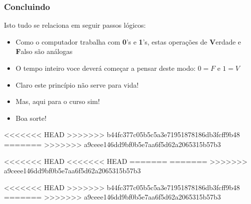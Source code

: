 \documentclass{beamer}
\begin{document}
\begin{frame}
\frametitle{Concluindo}


\begin{block}{Isto tudo se relaciona em seguir passos lógicos: }

\begin{itemize}

  \item Como o computador trabalha com \textbf{0}'s e \textbf{1}'s, estas operações de \textbf{V}erdade e \textbf{F}also são análogas
  \pause
    \item O tempo inteiro voce deverá começar a pensar deste modo: $0 = F$ e $1 = V$
      \pause
    \item Claro este princípio não serve para vida!
      \pause
    \item Mas, aqui para o curso sim!
      \pause
    \item Boa sorte!

\end{itemize}

  \end{block}

<<<<<<< HEAD
>>>>>>> b44fc377c05b5c5a3e71951878186db3fcff9b48
=======
>>>>>>> a9ceee146dd9bf0b5e7aa6f5d62a2065315b57b3

\end{frame}



<<<<<<< HEAD
<<<<<<< HEAD
=======
=======
>>>>>>> a9ceee146dd9bf0b5e7aa6f5d62a2065315b57b3








<<<<<<< HEAD
>>>>>>> b44fc377c05b5c5a3e71951878186db3fcff9b48
=======
>>>>>>> a9ceee146dd9bf0b5e7aa6f5d62a2065315b57b3
\end{document}
